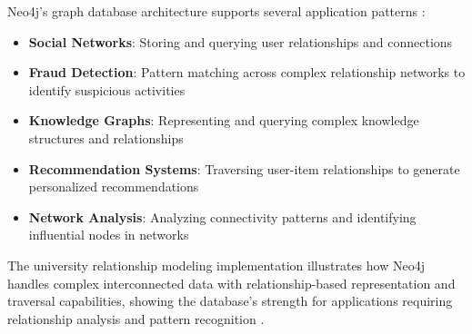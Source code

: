 Neo4j's graph database architecture supports several application patterns \parencite{neo4j_survey}:

\begin{itemize}
    \item \textbf{Social Networks}: Storing and querying user relationships and connections \parencite{neo4j_manual}
    \item \textbf{Fraud Detection}: Pattern matching across complex relationship networks to identify suspicious activities \parencite{neo4j_survey}
    \item \textbf{Knowledge Graphs}: Representing and querying complex knowledge structures and relationships \parencite{neo4j_manual}
    \item \textbf{Recommendation Systems}: Traversing user-item relationships to generate personalized recommendations \parencite{neo4j_survey}
    \item \textbf{Network Analysis}: Analyzing connectivity patterns and identifying influential nodes in networks \parencite{graph_visualization}
\end{itemize}

The university relationship modeling implementation illustrates how Neo4j handles complex interconnected data with relationship-based representation and traversal capabilities, showing the database's strength for applications requiring relationship analysis and pattern recognition \parencite{neo4j_manual}.